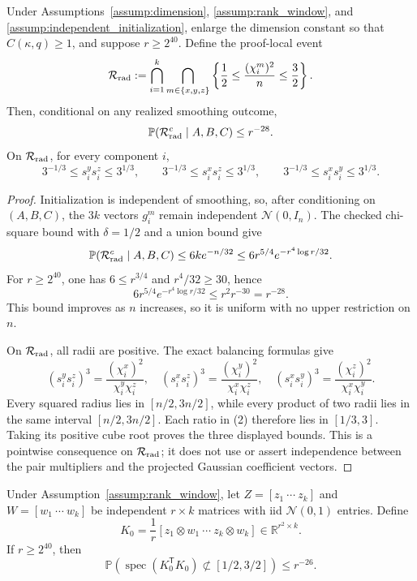 \begin{lemma}
\label{lem:step-003-radius-diagonals}
Under Assumptions~\ref{assump:dimension}, \ref{assump:rank_window}, and
\ref{assump:independent_initialization}, enlarge the dimension constant so
that \(C(\kappa,q)\ge1\), and suppose \(r\ge2^{40}\). Define the proof-local
event
\[
  \mathcal R_{\rm rad}
  :=\bigcap_{i=1}^k\bigcap_{m\in\{x,y,z\}}
    \left\{\frac12\le\frac{(\chi_i^m)^2}{n}\le\frac32\right\}.
\]
Then, conditional on any realized smoothing outcome,
\[
  \mathbb P(\mathcal R_{\rm rad}^c\mid A,B,C)\le r^{-28}.
\]
On \(\mathcal R_{\rm rad}\), for every component \(i\),
\[
  3^{-1/3}\le s_i^ys_i^z\le3^{1/3},\qquad
  3^{-1/3}\le s_i^xs_i^z\le3^{1/3},\qquad
  3^{-1/3}\le s_i^xs_i^y\le3^{1/3}.
\]

\end{lemma}

\begin{proof}
Initialization is independent of smoothing, so,
after conditioning on \((A,B,C)\), the \(3k\) vectors \(g_i^m\) remain
independent \(\mathcal N(0,I_n)\). The checked chi-square bound with
\(\delta=1/2\) and a union bound give
\[
  \mathbb P(\mathcal R_{\rm rad}^c\mid A,B,C)
  \le 6k e^{-n/32}
  \le 6r^{5/4}e^{-r^4\log r/32}.
\]
For \(r\ge2^{40}\), one has \(6\le r^{3/4}\) and \(r^4/32\ge30\), hence
\[
  6r^{5/4}e^{-r^4\log r/32}
  \le r^2r^{-30}=r^{-28}.                                  \tag{1}
\]
This bound improves as \(n\) increases, so it is uniform with no upper
restriction on \(n\).

On \(\mathcal R_{\rm rad}\), all radii are positive. The exact balancing formulas give
\[
  (s_i^ys_i^z)^3
    =\frac{(\chi_i^x)^2}{\chi_i^y\chi_i^z},\quad
  (s_i^xs_i^z)^3
    =\frac{(\chi_i^y)^2}{\chi_i^x\chi_i^z},\quad
  (s_i^xs_i^y)^3
    =\frac{(\chi_i^z)^2}{\chi_i^x\chi_i^y}.                \tag{2}
\]
Every squared radius lies in \([n/2,3n/2]\), while every product of two
radii lies in the same interval \([n/2,3n/2]\). Each ratio in (2) therefore
lies in \([1/3,3]\). Taking its positive cube root proves the three displayed
bounds. This is a pointwise consequence on \(\mathcal R_{\rm rad}\); it does
not use or assert independence between the pair multipliers and the projected
Gaussian coefficient vectors. 

\end{proof}


\begin{lemma}
\label{lem:step-003-isotropic-khatri-rao}
Under Assumption~\ref{assump:rank_window}, let
\(Z=[z_1\ \cdots\ z_k]\) and \(W=[w_1\ \cdots\ w_k]\) be independent
\(r\times k\) matrices with iid \(\mathcal N(0,1)\) entries. Define
\[
  K_0=\frac1r
    [z_1\otimes w_1\ \cdots\ z_k\otimes w_k]
    \in\mathbb R^{r^2\times k}.
\]
If \(r\ge2^{40}\), then
\[
  \mathbb P\!\left(
    \operatorname{spec}(K_0^{\mathsf T}K_0)
      \not\subset[1/2,3/2]
  \right)\le r^{-26}.                                      \tag{3}
\]

\end{lemma}

